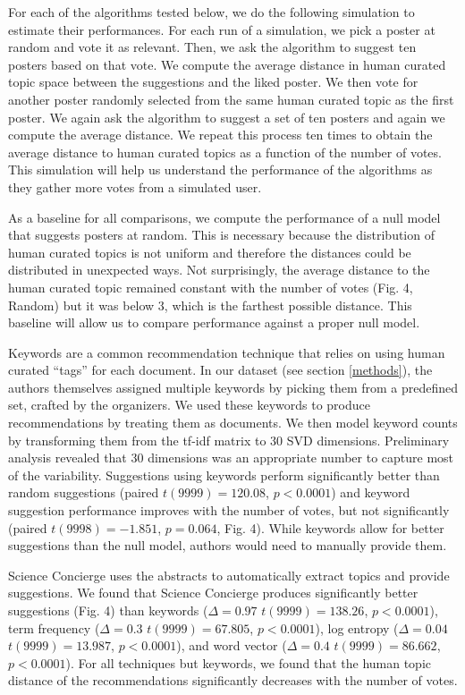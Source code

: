 \documentclass[a4paper]{article}
\begin{document}
For each of the algorithms tested below, we do the following simulation to estimate their performances. For each run of a simulation, we pick a poster at random and vote it as relevant. Then, we ask the algorithm to suggest ten posters based on that vote. We compute the average distance in human curated topic space between the suggestions and the liked poster. We then vote for another poster randomly selected from the same human curated topic as the first poster. We again ask the algorithm to suggest a set of ten posters and again we compute the average distance. We repeat this process ten times to obtain the average distance to human curated topics as a function of the number of votes. This simulation will help us understand the performance of the algorithms as they gather more votes from a simulated user.


As a baseline for all comparisons, we compute the performance of a null model that suggests posters at random. This is necessary because the distribution of human curated topics is not uniform and therefore the distances could be distributed in unexpected ways. Not surprisingly, the average distance to the human curated topic remained constant with the number of votes (Fig. 4, Random) but it was below 3, which is the farthest possible distance. This baseline will allow us to compare performance against a proper null model.

Keywords are a common recommendation technique that relies on using human curated “tags” for each document. In our dataset (see section \ref{methods}), the authors themselves assigned multiple keywords by picking them from a predefined set, crafted by the organizers. We used these keywords to produce  recommendations by treating them as documents. We then model keyword counts by transforming them from the tf-idf matrix to 30 SVD dimensions. Preliminary analysis revealed that 30 dimensions was an appropriate number to capture most of the variability. Suggestions using keywords perform significantly better than random suggestions (paired $t(9999) = 120.08$, $p < 0.0001$) and keyword suggestion performance improves with the number of votes, but not significantly (paired $t(9998) = -1.851$, $p = 0.064$, Fig. 4). While keywords allow for better suggestions than the null model, authors would need to manually provide them.


Science Concierge uses the abstracts to automatically extract topics and provide suggestions. We found that Science Concierge produces significantly better suggestions (Fig. 4) than keywords ($\Delta = 0.97$ $t(9999) = 138.26$, $p < 0.0001$),
term frequency
($\Delta = 0.3$ $t(9999) = 67.805$, $p < 0.0001$),
log entropy
($\Delta = 0.04$ $t(9999) = 13.987$, $p < 0.0001$),
and word vector
($\Delta = 0.4$ $t(9999) = 86.662$, $p < 0.0001$). For all techniques but
keywords, we found that the human topic distance of the recommendations
significantly decreases with the number of votes.
\end{document}
